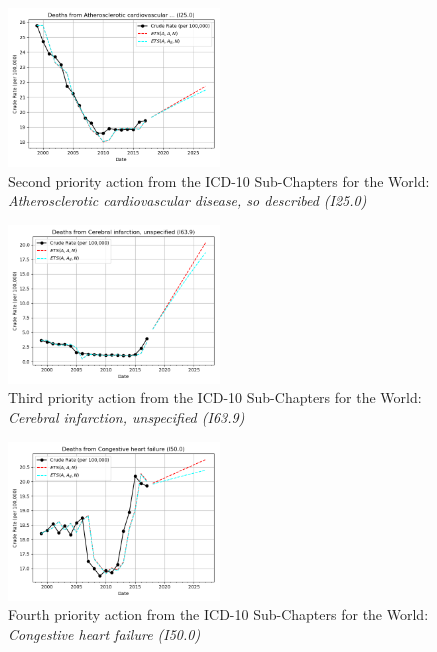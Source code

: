 \documentclass[10pt, a4paper, twocolumn]{IEEEconf}
\begin{document}
\begin{figure}[H]
  \centering
  \includegraphics[width=0.5\textwidth]{results/US_ICD10_MINIMALLY_GROUPED/Atherosclerotic_cardiovascular_disease_so_described_I25_0_ets.png}
  \caption{Second priority action from the ICD-10 Sub-Chapters for the World: \textit{Atherosclerotic cardiovascular disease, so described (I25.0)}}\label{fig:k12b}
\end{figure}

\begin{figure}[H]
  \centering
  \includegraphics[width=0.5\textwidth]{results/US_ICD10_MINIMALLY_GROUPED/Cerebral_infarction_unspecified_I63_9_ets.png}
  \caption{Third priority action from the ICD-10 Sub-Chapters for the World: \textit{Cerebral infarction, unspecified (I63.9)}}\label{fig:k12c}
\end{figure}

\begin{figure}[H]
  \centering
  \includegraphics[width=0.5\textwidth]{results/US_ICD10_MINIMALLY_GROUPED/Congestive_heart_failure_I50_0_ets.png}
  \caption{Fourth priority action from the ICD-10 Sub-Chapters for the World: \textit{Congestive heart failure (I50.0)}}\label{fig:k12d}
\end{figure}
\end{document}
